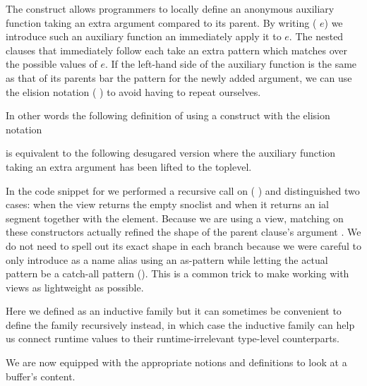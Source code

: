 \begin{remark}
  The  construct allows programmers to locally
  define an anonymous auxiliary function taking an extra argument
  compared to its parent.
  By writing ( \IdrisKeyword{(}$e$\IdrisKeyword{)})
  we introduce such an auxiliary function an immediately apply it to $e$.
  The nested clauses that immediately follow each take an extra pattern
  which matches over the possible values of $e$.
  If the left-hand side of the auxiliary function is the same as that of
  its parents bar the pattern for the newly added argument, we can use the
  elision notation (\IdrisKeyword{\_} \IdrisKeyword{|}) to avoid having to
  repeat ourselves.

  In other words the following definition of  using a
   construct with the elision notation


  \noindent is equivalent to the following desugared version where
  the auxiliary function taking an extra argument has been lifted
  to the toplevel.


\end{remark}

In the code snippet for  we performed a recursive call on
( ) and distinguished
two cases: when the view returns the empty snoclist \IdrisData{[<]}
and when it returns an ial segment together with the
 element.
%
Because we are using a view, matching on these constructors actually
refined the shape of the parent clause's argument .
We do not need to spell out its exact shape in each branch because
we were careful to only introduce  as a name alias
using an as-pattern while letting the actual pattern be a catch-all
pattern (\IdrisKeyword{\_}).
%
This is a common trick to make working with views as lightweight as
possible.

Here we defined  as an inductive family but it can
sometimes be convenient to define the family recursively instead,
in which case the  inductive family can
help us connect runtime values to their
runtime-irrelevant type-level counterparts.



We are now equipped with the appropriate notions and definitions to
look at a buffer's content.
